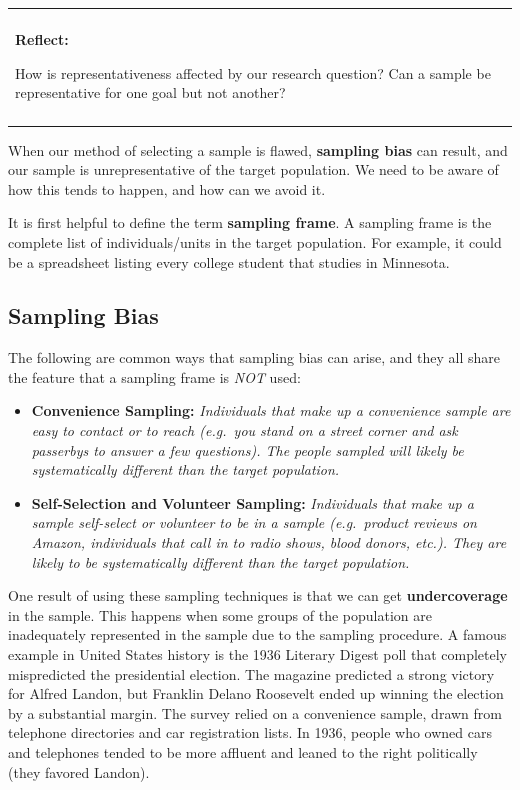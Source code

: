\documentclass[]{book}
\newenvironment{reflect}
{
    \begin{center}
    
    \begin{tabular}{|p{0.8\textwidth}|}
    \rowcolor{LightBlue}
    \hline\\
    \rowcolor{LightBlue}
    \textbf{Reflect:}
}
{
    \\\rowcolor{LightBlue}
    \\\hline
    \end{tabular} 
    \end{center}
}
\begin{document}
\begin{reflect}
How is representativeness affected by our research question? Can a
sample be representative for one goal but not another?
\end{reflect}

When our method of selecting a sample is flawed, \textbf{sampling bias} can result, and our sample is unrepresentative of the target population. We need to be aware of how this tends to happen, and how can we avoid it.

It is first helpful to define the term \textbf{sampling frame}. A sampling frame is the complete list of individuals/units in the target population. For example, it could be a spreadsheet listing every college student that studies in Minnesota.

\hypertarget{sampling-bias}{%
\subsection{Sampling Bias}\label{sampling-bias}}

The following are common ways that sampling bias can arise, and they all share the feature that a sampling frame is \emph{NOT} used:

\begin{itemize}
\item
  \textbf{Convenience Sampling:} \emph{Individuals that make up a convenience sample are easy to contact or to reach (e.g.~you stand on a street corner and ask passerbys to answer a few questions). The people sampled will likely be systematically different than the target population.}
\item
  \textbf{Self-Selection and Volunteer Sampling:} \emph{Individuals that make up a sample self-select or volunteer to be in a sample (e.g.~product reviews on Amazon, individuals that call in to radio shows, blood donors, etc.). They are likely to be systematically different than the target population.}
\end{itemize}

One result of using these sampling techniques is that we can get \textbf{undercoverage} in the sample. This happens when some groups of the population are inadequately represented in the sample due to the sampling procedure. A famous example in United States history is the 1936 Literary Digest poll that completely mispredicted the presidential election. The magazine predicted a strong victory for Alfred Landon, but Franklin Delano Roosevelt ended up winning the election by a substantial margin. The survey relied on a convenience sample, drawn from telephone directories and car registration lists. In 1936, people who owned cars and telephones tended to be more affluent and leaned to the right politically (they favored Landon).
\end{document}
